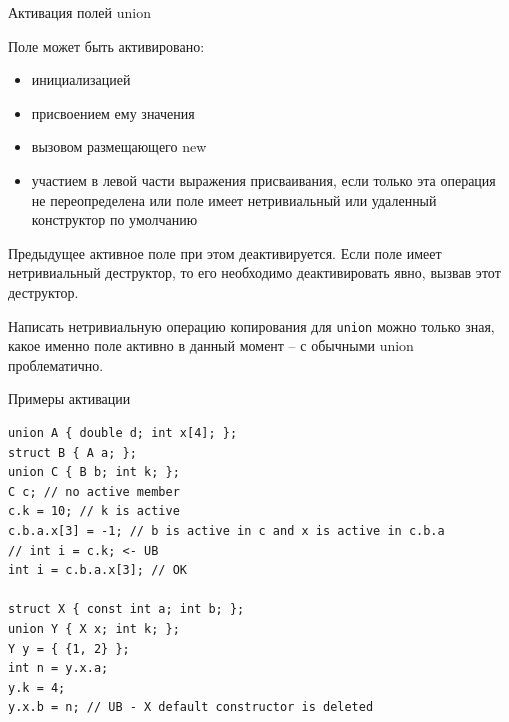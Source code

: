 \documentclass[unknownkeysallowed,xcolor=table]{beamer}
\begin{document}
\begin{frame}{Активация полей union}

Поле может быть активировано:

\begin{itemize}
  \item инициализацией
  \item присвоением ему значения
  \item вызовом размещающего new
  \item участием в левой части выражения присваивания, если только эта операция не переопределена или поле имеет нетривиальный или удаленный конструктор по умолчанию
\end{itemize}

\vspace{0.5em}

Предыдущее активное поле при этом деактивируется. Если поле имеет нетривиальный деструктор, то его необходимо деактивировать явно, вызвав этот деструктор.

\vspace{0.5em}

Написать нетривиальную операцию копирования для \lstinline{union} можно только зная, какое именно поле активно в данный момент -- с обычными union проблематично.

\end{frame}

\begin{frame}[fragile]{Примеры активации}

\begin{lstlisting}
union A { double d; int x[4]; };
struct B { A a; };
union C { B b; int k; };
C c; // no active member
c.k = 10; // k is active
c.b.a.x[3] = -1; // b is active in c and x is active in c.b.a
// int i = c.k; <- UB
int i = c.b.a.x[3]; // OK

struct X { const int a; int b; };
union Y { X x; int k; };
Y y = { {1, 2} };
int n = y.x.a;
y.k = 4;
y.x.b = n; // UB - X default constructor is deleted
\end{lstlisting}

\end{frame}
\end{document}

